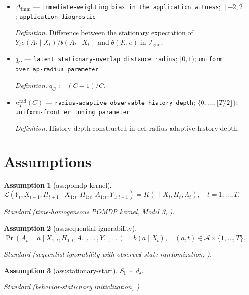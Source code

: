 \documentclass{article}
\newtheorem{assumption}{Assumption}
\begin{document}
\begin{itemize}
  \item \(\Delta_{\mathrm{imm}}\) --- \texttt{immediate-\allowbreak{}weighting bias in the application witness}; \([-2,2]\); \texttt{application diagnostic}
  \par\smallskip\noindent\emph{Definition.} Difference between the stationary expectation of \(Y_t e(A_t\mid X_t)/b(A_t\mid X_t)\) and \(\theta(K,e)\) in \(\mathcal I_{\mathrm{grid}}\).
  \item \(q_C\) --- \texttt{latent stationary-\allowbreak{}overlap distance radius}; \([0,1)\); \texttt{uniform overlap-\allowbreak{}radius parameter}
  \par\smallskip\noindent\emph{Definition.} \(q_C:=(C-1)/C\).
  \item \(\kappa_T^{\mathrm{rad}}(C)\) --- \texttt{radius-\allowbreak{}adaptive observable history depth}; \(\{0,\ldots,\lfloor T/2\rfloor\}\); \texttt{uniform-\allowbreak{}frontier tuning parameter}
  \par\smallskip\noindent\emph{Definition.} History depth constructed in \(\mathrm{def{:}radius\text{-}adaptive\text{-}history\text{-}depth}\).
\end{itemize}

\section{Assumptions}

\begin{assumption}[ass:pomdp-kernel]\label{ass:pomdp-kernel}
\(\mathcal L(Y_t,X_{t+1},H_{t+1}\mid X_{1:t},H_{1:t},A_{1:t},Y_{1:t-1})=K(\cdot\mid X_t,H_t,A_t),\quad t=1,\ldots,T\).
\par\smallskip\noindent\emph{Standard} (time-homogeneous POMDP kernel, Model 3, \cite{HuWager2023}).
\end{assumption}

\begin{assumption}[ass:sequential-ignorability]\label{ass:sequential-ignorability}
\(\Pr(A_t=a\mid X_{1:t},H_{1:t},A_{1:t-1},Y_{1:t-1})=b(a\mid X_t),\quad (a,t)\in\mathcal A\times\{1,\ldots,T\}\).
\par\smallskip\noindent\emph{Standard} (sequential ignorability with observed-state randomization, \cite{HuWager2023}).
\end{assumption}

\begin{assumption}[ass:stationary-start]\label{ass:stationary-start}
\(S_1\sim d_b\).
\par\smallskip\noindent\emph{Standard} (behavior-stationary initialization, \cite{HuWager2023}).
\end{assumption}
\end{document}
